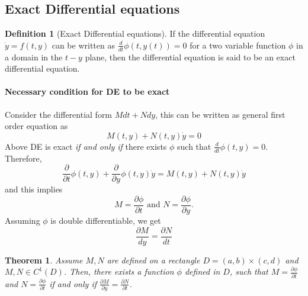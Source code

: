\documentclass[12pt,reqno]{amsart}
\theoremstyle{plain}
\newtheorem{thm}{Theorem}
\theoremstyle{definition}
\newtheorem{defn}{Definition}
\begin{document}
\subsection{Exact Differential equations}
\begin{defn}[Exact Differential equations]
    If the differential equation $ \dot{y} = f(t, y)$ can be written as $\frac{d}{dt}\phi(t,y(t)) = 0$ for a two variable function $\phi$ in a domain in the $t-y$ plane, then the differential equation is said to be an exact differential equation.
\end{defn}
\paragraph{\bf Necessary condition for DE to be exact}
Consider the differential form $Mdt + Ndy$, this can be written as general first order equation as
$$ M(t,y) + N(t,y) \dot{y} = 0$$
Above DE is exact {\it if and only if} there exists $\phi$ such that $\frac{d}{dt}\phi(t,y) = 0$. Therefore,
$$ \frac{\partial}{\partial t}\phi(t,y) + \frac{\partial}{\partial y}\phi(t,y)\dot{y} = M(t,y) + N(t,y) \dot{y} $$ and this implies 
$$ M = \frac{\partial \phi}{\partial t} \text{ and } N = \frac{\partial \phi}{\partial y}.$$
Assuming $\phi$ is double differentiable, we get 
$$ \frac{\partial M}{dy} = \frac{\partial N}{dt}$$
\begin{thm}
    Assume $M,N$ are defined on a rectangle $D = (a,b) \times (c,d)$ and $M,N \in C^1(D)$. Then, there exists a function $\phi$ defined in $D$, such that $M = \frac{\partial \phi}{\partial t}$ and $N = \frac{\partial \phi}{\partial t}$ if and only if $\frac{\partial M}{\partial y} = \frac{\partial N}{\partial t}$.
\end{thm}
\end{document}
